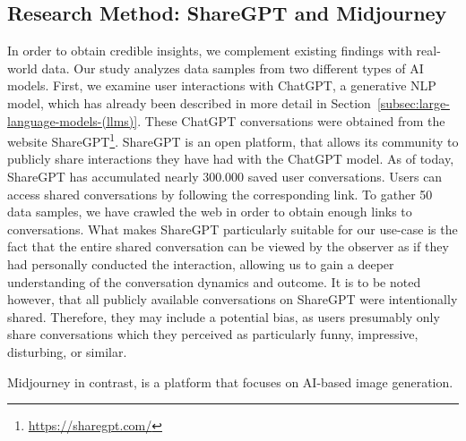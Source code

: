 \subsection{Research Method: ShareGPT and Midjourney}
\label{subsec:research-method:-sharegpt-and-midjourney}
In order to obtain credible insights, we complement existing findings with real-world data.
Our study analyzes data samples from two different types of AI models.
First, we examine user interactions with ChatGPT, a generative NLP model, which has already been
described in more detail in Section~\ref{subsec:large-language-models-(llms)}.
These ChatGPT conversations were obtained from the website ShareGPT\footnote{\url{https://sharegpt.com/}}.
ShareGPT is an open platform, that allows its community to publicly share interactions they have
had with the ChatGPT model.
As of today, ShareGPT has accumulated nearly 300.000 saved user conversations.
Users can access shared conversations by following the corresponding link.
To gather 50 data samples, we have crawled the web in order to obtain enough links to conversations.
What makes ShareGPT particularly suitable for our use-case is the fact that the entire shared conversation
can be viewed by the observer as if they had personally conducted the interaction, allowing us to
gain a deeper understanding of the conversation dynamics and outcome.
It is to be noted however, that all publicly available conversations on ShareGPT were
intentionally shared.
Therefore, they may include a potential bias, as users presumably only share conversations which
they perceived as particularly funny, impressive, disturbing, or similar.
\newline

Midjourney in contrast, is a platform that focuses on AI-based image generation.

